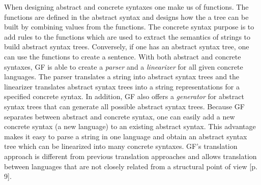 When designing abstract and concrete syntaxes one make us of functions. The functions are defined in the abstract syntax and designs how the a tree can be built by combining values from the functions. The concrete syntax purpose is to add rules to the functions which are used to extract the semantics of strings to build abstract syntax trees. Conversely, if one has an abstract syntax tree, one can use the functions to create a sentence.
\newline
\newline
With both abstract and concrete syntaxes, GF is able to create a \emph{parser} and a \emph{linearizer} for all given concrete languages. The parser translates a string into abstract syntax trees and the linearizer translates abstract syntax trees into a string representations for a specified concrete syntax. In addition, GF also offers a \emph{generator} for abstract syntax trees that can generate all possible abstract syntax trees.
\newline
\newline
Because GF separates between abstract and concrete syntax, one can easily add a new concrete syntax (a new language) to an existing abstract syntax. This advantage makes it easy to parse a string in one language and obtain an abstract syntax tree which can be linearized into many concrete syntaxes.
\newline
\newline
GF's translation approach is different from previous translation approaches and allows translation between languages that are not closely related from a structural point of view \cite{enache:2013}[p. 9].

